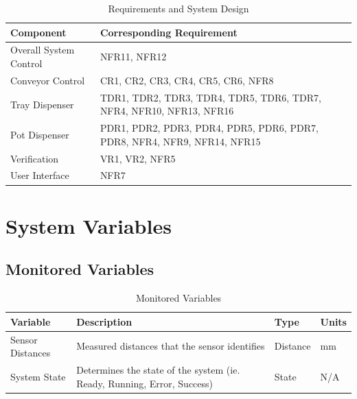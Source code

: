 \documentclass[12pt, titlepage]{article}
\begin{document}
\begin{table}[H]
\caption{Requirements and System Design}
\begin{tabularx}{\textwidth}{|l|X|}
\hline
\textbf{Component} & \textbf{Corresponding Requirement} \\ \hline
Overall System Control  & NFR11, NFR12 \\ \hline
Conveyor Control   & CR1, CR2, CR3, CR4, CR5, CR6, NFR8 \\ \hline
Tray Dispenser   & TDR1, TDR2, TDR3, TDR4, TDR5, TDR6, TDR7, NFR4, NFR10, NFR13, NFR16 \\ \hline
Pot Dispenser   &  PDR1, PDR2, PDR3, PDR4, PDR5, PDR6, PDR7, PDR8, NFR4, NFR9, NFR14, NFR15  \\ \hline
Verification   &  VR1, VR2, NFR5 \\ \hline
User Interface  &  NFR7 \\ \hline
\end{tabularx}
\end{table}

\section{System Variables}


\subsection{Monitored Variables}
\begin{table}[H]
\caption{Monitored Variables}
\begin{tabular}{ |p{3cm}|p{9cm}|p{2cm}|p{1cm}| }
  \hline
  Variable & Description & Type & Units\\
  \hline
  Sensor Distances & Measured distances that the sensor identifies
   & Distance & mm\\
  \hline
  System State & Determines the state of the system (ie. Ready, Running, Error, Success)
   & State &  N/A\\
  \hline
 \end{tabular}\\\\
 \end{table}
\end{document}
